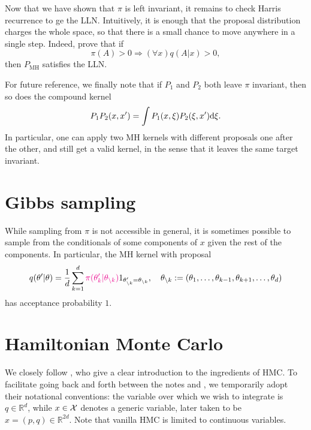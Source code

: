 Now that we have shown that $\pi$ is left invariant, it remains to check Harris recurrence to ge the LLN.
Intuitively, it is enough that the proposal distribution charges the whole space, so that there is a small chance to move anywhere in a single step.
Indeed, \cite{RoCa04} prove that if 
$$
    \pi(A)>0\Rightarrow (\forall x) q(A\vert x)>0, 
$$
then $P_{\text{MH}}$ satisfies the LLN.

For future reference, we finally note that if $P_1$ and $P_2$ both leave $\pi$ invariant, then so does the compound kernel
$$
    P_1P_2(x, x') = \int P_1(x, \xi)P_2(\xi, x') \mathrm{d}\xi.
$$
In particular, one can apply two MH kernels with different proposals one after the other, and still get a valid kernel, in the sense that it leaves the same target invariant.

\section{Gibbs sampling}
\label{s:gibbs}
While sampling from $\pi$ is not accessible in general, it is sometimes possible to sample from the conditionals of some components of $x$ given the rest of the components. 
In particular, the MH kernel with proposal
$$
    q(\theta'\vert\theta) = \frac1d \sum_{k=1}^d \textcolor{magenta}{\pi(\theta'_k\vert \theta_{\setminus k})} 1_{\theta'_{\setminus k} = \theta_{\setminus k}}, \quad \theta_{\setminus k}:= (\theta_1,\dots,\theta_{k-1},\theta_{k+1},\dots,\theta_d)
$$
has acceptance probability $1$.

\section{Hamiltonian Monte Carlo}
We closely follow \cite{BoSa18}, who give a clear introduction to the ingredients of HMC.
To facilitate going back and forth between the notes and \citep{BoSa18}, we temporarily adopt their notational conventions: the variable over which we wish to integrate is $q\in\mathbb{R}^d$, while $x\in\mathcal{X}$ denotes a generic variable, later taken to be $x=(p,q)\in\mathbb{R}^{2d}$.
Note that vanilla HMC is limited to continuous variables.

